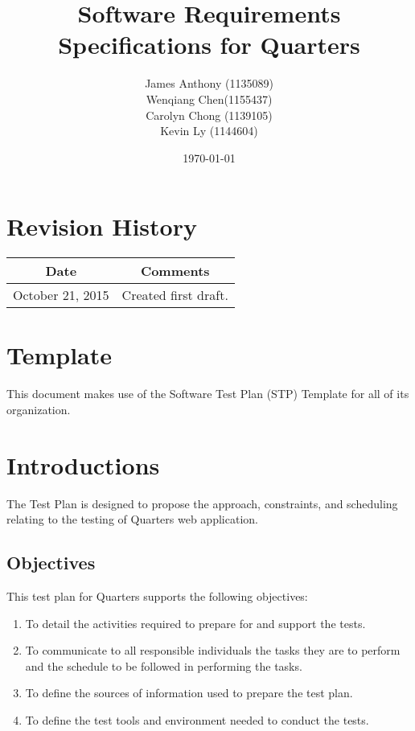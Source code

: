 \documentclass[12pt]{article}
\begin{document}
\title{Software Requirements Specifications for Quarters} 
\author{James Anthony (1135089)\\ Wenqiang Chen(1155437)\\ Carolyn Chong 
(1139105)\\ Kevin Ly (1144604)}
\date{\today}
	
\maketitle

\pagebreak

\tableofcontents

\section*{Revision History}
\begin{tabular}{|c|c|}
\hline
\textbf{Date}  & \textbf{Comments} \\ \hline
October 21, 2015 & Created first draft. \\ 
\hline
\end{tabular}

\section*{Template}
This document makes use of the Software Test Plan (STP) Template for all of its organization.



%
%

\section{Introductions}
The Test Plan is designed to propose the approach, constraints, and scheduling relating to the testing of Quarters web application.


\subsection{Objectives}
This test plan for Quarters supports the following objectives:

\begin{enumerate}
\item To detail the activities required to prepare for and support the tests.
\item To communicate to all responsible individuals the tasks they are to perform and the schedule to be followed in performing the tasks.
\item To define the sources of information used to prepare the test plan.
\item To define the test tools and environment needed to conduct the tests.
\end{enumerate}
\end{document}
